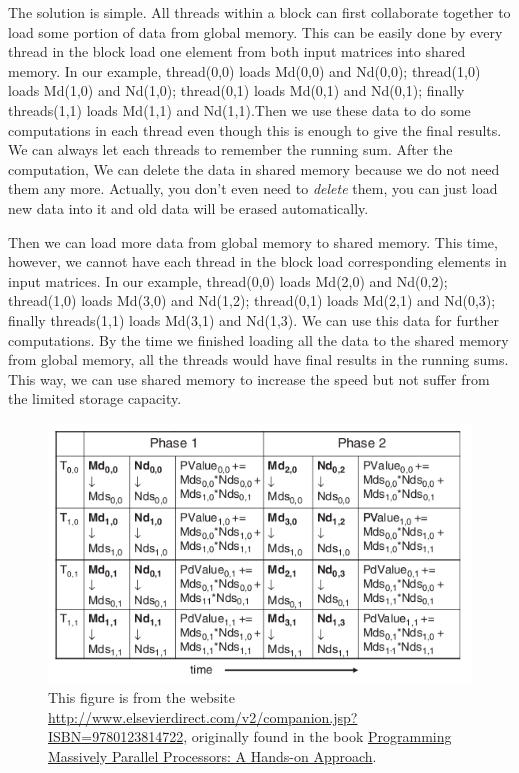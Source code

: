 \documentclass[letterpaper,10pt,openany,oneside]{sphinxmanual}
\begin{document}
The solution is simple. All threads within a block can first collaborate together to load some portion of data from global memory. This can be easily done by every thread in the block load one element from both input matrices into shared memory. In our example, thread(0,0) loads Md(0,0) and Nd(0,0); thread(1,0) loads Md(1,0) and Nd(1,0); thread(0,1) loads Md(0,1) and Nd(0,1); finally threads(1,1) loads Md(1,1) and Nd(1,1).Then we use these data to do some computations in each thread even though this is enough to give the final results. We can always let each threads to remember the running sum. After the computation, We can delete the data in shared memory because we do not need them any more. Actually, you don't even need to \emph{delete} them, you can just load new data into it and old data will be erased automatically.

Then we can load more data from global memory to shared memory. This time, however, we cannot have each thread in the block load corresponding elements in input matrices. In our example, thread(0,0) loads Md(2,0) and Nd(0,2); thread(1,0) loads Md(3,0) and Nd(1,2); thread(0,1) loads Md(2,1) and Nd(0,3); finally threads(1,1) loads Md(3,1) and Nd(1,3). We can use this data for further computations. By the time we finished loading all the data to the shared memory from global memory, all the threads would have final results in the running sums. This way, we can use shared memory to increase the speed but not suffer from the limited storage capacity.
\begin{figure}[htbp]
\centering
\capstart

\includegraphics{MMSM2.png}
\caption{This figure is from the website \href{http://www.elsevierdirect.com/v2/companion.jsp?ISBN=9780123814722}{http://www.elsevierdirect.com/v2/companion.jsp?ISBN=9780123814722}, originally found in the book \href{http://www.elsevierdirect.com/morgan\_kaufmann/kirk/}{Programming Massively Parallel Processors: A Hands-on Approach}.}\end{figure}
\end{document}
